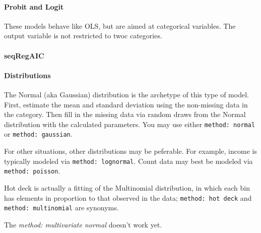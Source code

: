 \documentclass{article}
\begin{document}

\paragraph{Probit and Logit} These models behave like OLS, but are aimed at categorical
variables. The output variable is not restricted to twoc categories.

\paragraph{seqRegAIC}


\paragraph{Distributions} The Normal (aka Gaussian) distribution is the archetype of this
type of model. First, estimate the mean and standard deviation using the non-missing data
in the category. Then fill in the missing data via random draws from the Normal
distribution with the calculated parameters. You may use either {\tt method: normal} or
{\tt method: gaussian}.

For other situations, other distributions may be peferable. For example, income is
typically modeled via {\tt method: lognormal}. Count data may best be modeled via {\tt
method: poisson}.

Hot deck is actually a fitting of the Multinomial distribution, in which each bin has
elements in proportion to that observed in the data; {\tt method: hot deck} and {\tt
method: multinomial} are synonyms.

The {\em method: multivariate normal} doesn't work yet.
\end{document}

